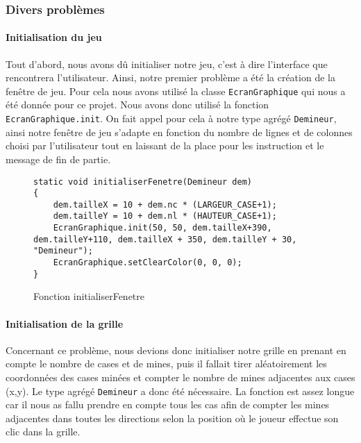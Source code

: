 \documentclass[a4paper, 12pt, oneside]{article}
\newcommand{\var}[1]{\texttt{#1}}
\begin{document}
\subsubsection{Divers problèmes}
\paragraph{Initialisation du jeu} Tout d'abord, nous avons dû initialiser notre jeu, c'est à dire l'interface que rencontrera l'utilisateur. Ainsi, notre premier problème a été la création de la fenêtre de jeu. Pour cela nous avons utilisé la classe \var{EcranGraphique} qui nous a été donnée pour ce projet. Nous avons donc utilisé la fonction \var{EcranGraphique.init}. On fait appel pour cela à notre type agrégé \var{Demineur}, ainsi notre fenêtre de jeu s'adapte en fonction du nombre de lignes et de colonnes choisi par l'utilisateur tout en laissant de la place pour les instruction et le message de fin de partie.

\begin{figure}[hpt]
	\center
	\caption{\label{Fonction initialiserFenetre} Fonction initialiserFenetre}
\begin{lstlisting}
static void initialiserFenetre(Demineur dem)
{
	dem.tailleX = 10 + dem.nc * (LARGEUR_CASE+1);
	dem.tailleY = 10 + dem.nl * (HAUTEUR_CASE+1);
	EcranGraphique.init(50, 50, dem.tailleX+390, dem.tailleY+110, dem.tailleX + 350, dem.tailleY + 30, "Demineur");
	EcranGraphique.setClearColor(0, 0, 0);
}
\end{lstlisting}
\end{figure} 

\paragraph{Initialisation de la grille} Concernant ce problème, nous devions donc initialiser notre grille en prenant en compte le nombre de cases et de mines, puis il fallait tirer aléatoirement les coordonnées des cases minées et compter le nombre de mines adjacentes aux cases (x,y). Le type agrégé \var{Demineur} a donc été nécessaire. La fonction est assez longue car il nous as fallu prendre en compte tous les cas afin de compter les mines adjacentes dans toutes les directions selon la position où le joueur effectue son clic dans la grille.
\end{document}

